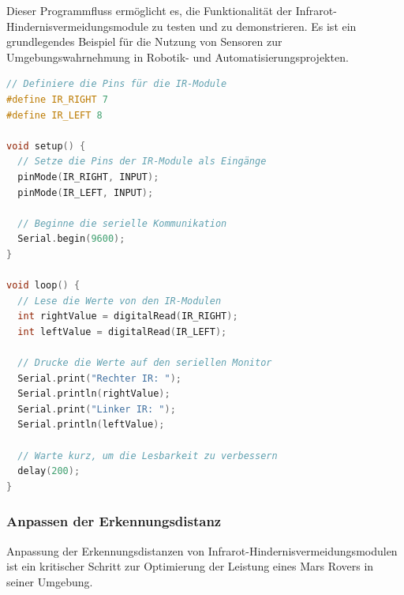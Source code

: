 \documentclass{vorlage-design-main}
\begin{document}
Dieser Programmfluss ermöglicht es, die Funktionalität der
Infrarot-Hindernisvermeidungsmodule zu testen und zu demonstrieren. Es
ist ein grundlegendes Beispiel für die Nutzung von Sensoren zur
Umgebungswahrnehmung in Robotik- und Automatisierungsprojekten.

\begin{lstlisting}[language={C++}]
// Definiere die Pins für die IR-Module
#define IR_RIGHT 7
#define IR_LEFT 8

void setup() {
  // Setze die Pins der IR-Module als Eingänge
  pinMode(IR_RIGHT, INPUT);
  pinMode(IR_LEFT, INPUT);

  // Beginne die serielle Kommunikation
  Serial.begin(9600);
}

void loop() {
  // Lese die Werte von den IR-Modulen
  int rightValue = digitalRead(IR_RIGHT);
  int leftValue = digitalRead(IR_LEFT);

  // Drucke die Werte auf den seriellen Monitor
  Serial.print("Rechter IR: ");
  Serial.println(rightValue);
  Serial.print("Linker IR: ");
  Serial.println(leftValue);

  // Warte kurz, um die Lesbarkeit zu verbessern
  delay(200);
}
\end{lstlisting}

\hypertarget{anpassen-der-erkennungsdistanz}{%
\subsubsection{Anpassen der
Erkennungsdistanz}\label{anpassen-der-erkennungsdistanz}}

Anpassung der Erkennungsdistanzen von
Infrarot-Hindernisvermeidungsmodulen ist ein kritischer Schritt zur
Optimierung der Leistung eines Mars Rovers in seiner Umgebung.
\end{document}
